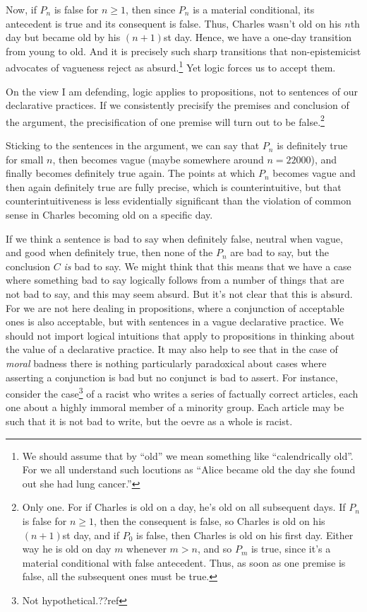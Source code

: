 Now, if $P_n$ is false for $n\ge 1$, then since $P_n$ is a material conditional, its 
antecedent is true and its consequent is false. Thus, Charles wasn't old on his $n$th
day but became old by his $(n+1)$st day. Hence, we have a one-day transition from 
young to old. And it is precisely such sharp transitions that non-epistemicist advocates
of vagueness reject as absurd.\footnote{We should assume that by ``old'' we mean something like
``calendrically old''. For we all understand such locutions as ``Alice became old the
day she found out she had lung cancer.''} Yet logic forces us to accept them.

On the view I am defending, logic applies to propositions, not to 
sentences of our declarative practices. If we consistently precisify the premises and conclusion
of the argument, the precisification of one premise will turn out to be false.\footnote{Only one. For if Charles is old
on a day, he's old on all subsequent days. If $P_n$ is false for $n\ge 1$, then the consequent
is false, so Charles is old on his $(n+1)$st day, and if $P_0$ is false, then Charles is old on
his first day. Either way he is old on day $m$ whenever $m>n$, and
so $P_m$ is true, since it's a material conditional with false antecedent. Thus, as soon as one
premise is false, all the subsequent ones must be true.} 

Sticking to the sentences in the argument, we can say that $P_n$ is definitely true for small $n$,
then becomes vague (maybe somewhere around $n=22000$), and finally becomes definitely true again. 
The points at which $P_n$ becomes vague and then again definitely true are fully precise, which is 
counterintuitive, but that counterintuitiveness is less evidentially significant than the 
violation of common sense in Charles becoming old on a specific day.

If we think a sentence is bad to say when definitely false, neutral when vague, and good when
definitely true, then none of the $P_n$ are bad to say, but the conclusion $C$ \textit{is} bad
to say. We might think that this means that we have a case where something bad to say logically
follows from a number of things that are not bad to say, and this may seem absurd. But
it's not clear that this is absurd. For we are not here dealing in propositions, where a conjunction
of acceptable ones is also acceptable, but with sentences in a vague declarative practice. We should
not import logical intuitions that apply to propositions in thinking about the value of a declarative
practice. It may also help to see that in the case of \textit{moral} badness there is nothing particularly
paradoxical about cases where asserting a conjunction is bad but no conjunct is bad to assert. For instance,
consider the case\footnote{Not hypothetical.??ref} of a racist who writes a series of 
factually correct articles, each one about a highly immoral member of a minority group. Each
article may be such that it is not bad to write, but the oevre as a whole is racist. 

